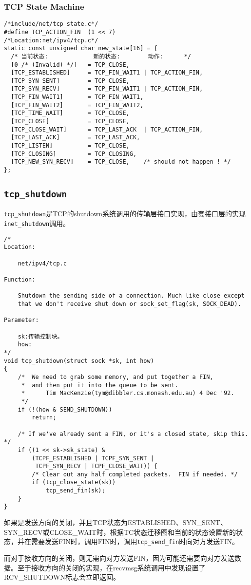 		\subsubsection{TCP State Machine}

\begin{verbatim}
/*include/net/tcp_state.c*/
#define TCP_ACTION_FIN	(1 << 7)
/*Location:net/ipv4/tcp.c*/
static const unsigned char new_state[16] = {
  /* 当前状态:             新的状态:        动作:      */
  [0 /* (Invalid) */]   = TCP_CLOSE,
  [TCP_ESTABLISHED]     = TCP_FIN_WAIT1 | TCP_ACTION_FIN,
  [TCP_SYN_SENT]        = TCP_CLOSE,
  [TCP_SYN_RECV]        = TCP_FIN_WAIT1 | TCP_ACTION_FIN,
  [TCP_FIN_WAIT1]       = TCP_FIN_WAIT1,
  [TCP_FIN_WAIT2]       = TCP_FIN_WAIT2,
  [TCP_TIME_WAIT]       = TCP_CLOSE,
  [TCP_CLOSE]           = TCP_CLOSE,
  [TCP_CLOSE_WAIT]      = TCP_LAST_ACK  | TCP_ACTION_FIN,
  [TCP_LAST_ACK]        = TCP_LAST_ACK,
  [TCP_LISTEN]          = TCP_CLOSE,
  [TCP_CLOSING]         = TCP_CLOSING,
  [TCP_NEW_SYN_RECV]    = TCP_CLOSE,    /* should not happen ! */
};
\end{verbatim}
    \subsection{\texttt{tcp_shutdown}}

        \texttt{tcp_shutdown}是TCP的shutdown系统调用的传输层接口实现，由套接口层的实现\texttt{inet_shutdown}调用。
\begin{verbatim}
/*
Location:

    net/ipv4/tcp.c

Function:
    
    Shutdown the sending side of a connection. Much like close except
    that we don't receive shut down or sock_set_flag(sk, SOCK_DEAD).

Parameter:

    sk:传输控制块。
    how:
*/
void tcp_shutdown(struct sock *sk, int how)
{
    /*  We need to grab some memory, and put together a FIN,
     *  and then put it into the queue to be sent.
     *      Tim MacKenzie(tym@dibbler.cs.monash.edu.au) 4 Dec '92.
     */
    if (!(how & SEND_SHUTDOWN))
        return;

    /* If we've already sent a FIN, or it's a closed state, skip this. */
    if ((1 << sk->sk_state) &
        (TCPF_ESTABLISHED | TCPF_SYN_SENT |
         TCPF_SYN_RECV | TCPF_CLOSE_WAIT)) {
        /* Clear out any half completed packets.  FIN if needed. */
        if (tcp_close_state(sk))
            tcp_send_fin(sk);
    }
}
\end{verbatim}
        如果是发送方向的关闭，并且TCP状态为ESTABLISHED、SYN\_SENT、SYN\_RECV或CLOSE\_WAIT时，根据TC状态迁移图和当前的状态设置新的状态，并在需要发送FIN时，调用FIN时，调用\texttt{tcp_send_fin}时向对方发送FIN。

        而对于接收方向的关闭，则无需向对方发送FIN，因为可能还需要向对方发送数据。至于接收方向的关闭的实现，在recvmsg系统调用中发现设置了RCV\_SHUTDOWN标志会立即返回。


